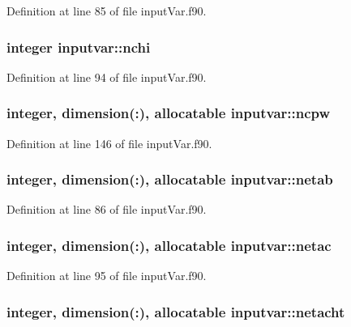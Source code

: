 Definition at line 85 of file input\-Var.\-f90.

\hypertarget{classinputvar_ac34eff504af528e971c7174dfcb39028}{
\subsubsection[{nchi}]{\setlength{\rightskip}{0pt plus 5cm}integer inputvar\-::nchi}}\label{classinputvar_ac34eff504af528e971c7174dfcb39028}


Definition at line 94 of file input\-Var.\-f90.

\hypertarget{classinputvar_a58640e3824c5fa77d6d108cf97b7a0bc}{
\subsubsection[{ncpw}]{\setlength{\rightskip}{0pt plus 5cm}integer, dimension(\-:), allocatable inputvar\-::ncpw}}\label{classinputvar_a58640e3824c5fa77d6d108cf97b7a0bc}


Definition at line 146 of file input\-Var.\-f90.

\hypertarget{classinputvar_af109996c7b379bac5d6c3d89c5b6df1d}{
\subsubsection[{netab}]{\setlength{\rightskip}{0pt plus 5cm}integer, dimension(\-:), allocatable inputvar\-::netab}}\label{classinputvar_af109996c7b379bac5d6c3d89c5b6df1d}


Definition at line 86 of file input\-Var.\-f90.

\hypertarget{classinputvar_ad9998f4f97f100bf6294fb8fa083bfe7}{
\subsubsection[{netac}]{\setlength{\rightskip}{0pt plus 5cm}integer, dimension(\-:), allocatable inputvar\-::netac}}\label{classinputvar_ad9998f4f97f100bf6294fb8fa083bfe7}


Definition at line 95 of file input\-Var.\-f90.

\hypertarget{classinputvar_a7f82eda09f512dfe2f28f82efc5187ad}{
\subsubsection[{netacht}]{\setlength{\rightskip}{0pt plus 5cm}integer, dimension(\-:), allocatable inputvar\-::netacht}}\label{classinputvar_a7f82eda09f512dfe2f28f82efc5187ad}


